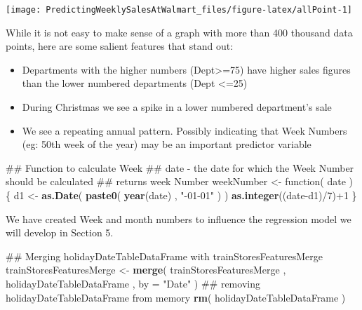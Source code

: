 \documentclass[]{article}
\newenvironment{Shaded}{\begin{snugshade}}{\end{snugshade}}
\newcommand{\KeywordTok}[1]{\textcolor[rgb]{0.13,0.29,0.53}{\textbf{{#1}}}}
\newcommand{\DataTypeTok}[1]{\textcolor[rgb]{0.13,0.29,0.53}{{#1}}}
\newcommand{\DecValTok}[1]{\textcolor[rgb]{0.00,0.00,0.81}{{#1}}}
\newcommand{\StringTok}[1]{\textcolor[rgb]{0.31,0.60,0.02}{{#1}}}
\newcommand{\NormalTok}[1]{{#1}}
\begin{document}
\texttt{[image: PredictingWeeklySalesAtWalmart\_files/figure-latex/allPoint-1]}

While it is not easy to make sense of a graph with more than 400
thousand data points, here are some salient features that stand out:

\begin{itemize}
\itemsep1pt\parskip0pt
\item
  Departments with the higher numbers (Dept\textgreater{}=75) have
  higher sales figures than the lower numbered departments (Dept
  \textless{}=25)
\item
  During Christmas we see a spike in a lower numbered department's sale
\item
  We see a repeating annual pattern. Possibly indicating that Week
  Numbers (eg: 50th week of the year) may be an important predictor
  variable
\end{itemize}

\begin{Shaded}
\begin{Highlighting}[]
\NormalTok{## Function to calculate Week}
\NormalTok{## date - the date for which the Week Number should be calculated}
\NormalTok{## returns week Number}
\NormalTok{weekNumber <-}\StringTok{ }\NormalTok{function( date ) \{}
  \NormalTok{d1 <-}\StringTok{ }\KeywordTok{as.Date}\NormalTok{( }\KeywordTok{paste0}\NormalTok{( }\KeywordTok{year}\NormalTok{(date) , }\StringTok{"-01-01"} \NormalTok{) )}
  \KeywordTok{as.integer}\NormalTok{((date-d1)/}\DecValTok{7}\NormalTok{)+}\DecValTok{1}
\NormalTok{\}}
\end{Highlighting}
\end{Shaded}

\begin{Shaded}
\end{Shaded}

We have created Week and month numbers to influence the regression model
we will develop in Section 5.

\begin{Shaded}
\begin{Highlighting}[]
\NormalTok{## Merging holidayDateTableDataFrame with trainStoresFeaturesMerge}
\NormalTok{trainStoresFeaturesMerge <-}\StringTok{ }
\StringTok{  }\KeywordTok{merge}\NormalTok{( trainStoresFeaturesMerge , holidayDateTableDataFrame , }\DataTypeTok{by =} \StringTok{"Date"} \NormalTok{)}
\NormalTok{## removing holidayDateTableDataFrame from memory}
\KeywordTok{rm}\NormalTok{( holidayDateTableDataFrame )}
\end{Highlighting}
\end{Shaded}
\end{document}
